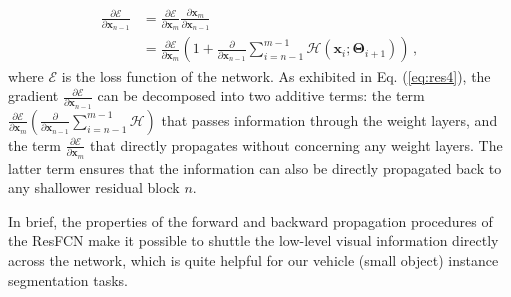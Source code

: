 \documentclass[journal]{IEEEtran}
\begin{document}
\begin{equation}\label{eq:res4}
\begin{split}
\frac{\partial \mathcal{E}}{\partial \bm{x}_{n-1}}&=\frac{\partial \mathcal{E}}{\partial \bm{x}_m}\frac{\partial \bm{x}_m}{\partial \bm{x}_{n-1}}\\
&=\frac{\partial \mathcal{E}}{\partial \bm{x}_m}(1+\frac{\partial}{\partial \bm{x}_{n-1}}\sum_{i=n-1}^{m-1}\mathcal{H}(\bm{x}_{i};\bm{\Theta}_{i+1}))\,,
\end{split}
\end{equation}
where $\mathcal{E}$ is the loss function of the network. As exhibited in Eq. (\ref{eq:res4}), the gradient $\frac{\partial \mathcal{E}}{\partial \bm{x}_{n-1}}$ can be decomposed into two additive terms: the term $\frac{\partial \mathcal{E}}{\partial \bm{x}_m}(\frac{\partial}{\partial \bm{x}_{n-1}}\sum_{i=n-1}^{m-1}\mathcal{H})$ that passes information through the weight layers, and the term $\frac{\partial \mathcal{E}}{\partial \bm{x}_m}$ that directly propagates without concerning any weight layers. The latter term ensures that the information can also be directly propagated back to any shallower residual block $n$.
\par
In brief, the properties of the forward and backward propagation procedures of the ResFCN make it possible to shuttle the low-level visual information directly across the network, which is quite helpful for our vehicle (small object) instance segmentation tasks.
\end{document}
